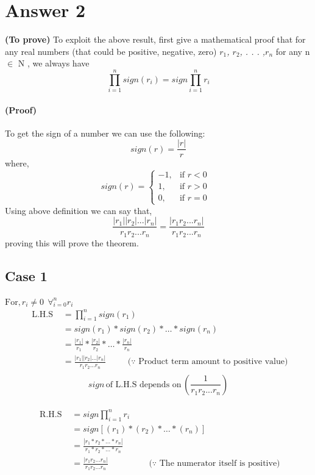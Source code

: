 \documentclass{article}
\begin{document}
\section{Answer 2}
\label{gen_inst}
\textbf{(To prove)}  To exploit the above result, first give a mathematical proof that for any real numbers
(that could be positive, negative, zero) \emph{$r_1$, $r_2$, . . . ,$ r_n$} for any n $\in$ N , we always have
\[\prod_{i=1 }^n sign(r_i) = sign \prod_{i=1}^n r_i\]

\paragraph{(Proof)}
To get the sign of a number we can use the following:
\begin{equation} \label{eq2}
sign(r)= \frac{|r|}{r}
\end{equation}
where,
$$
sign(r)=\begin{cases}
			-1, & \text{if $r<0$ }\\
            1, & \text{if $r>0$}\\
	0, & \text{if $r=0$}
		 \end{cases}
$$
Using above definition we can say that,
\[ \frac{|r_1||r_2|...|r_n|}{r_1r_2...r_n} = \frac {|r_1r_2...r_n|}{r_1r_2...r_n}\]
proving this will prove the theorem.\\

\subsection{Case 1}

$ \text{For,} \, r_i \ne 0  \;\, \forall_{i=0}^n r_i $
\begin{equation} \label{eq3}
\begin{split}
\text{ L.H.S } & =  \prod_{i=1 }^n sign(r_1)  \\
& = sign(r_1)*sign(r_2)*\dots *sign(r_n)  \\
& = \frac{|r_1|}{r_1}*\frac{|r_2|}{r_2}*\dots * \frac{|r_n|}{r_n}\\
& = \frac{|r_1||r_2|...|r_n|}{r_1r_2...r_n}\, \hspace{1cm} \text{($\because$ Product term amount to positive value)}\\
\end{split}
\end{equation}
\[sign \, \text{of L.H.S depends on}\, (\frac{1}{r_1r_2...r_n})\]
\\
\begin{equation} \label{eq4}
\begin{split}
\text{ R.H.S } & =  sign \prod_{i=1}^n r_i \\
& = sign[(r_1)*(r_2)*\dots *(r_n)]  \\
& = \frac{|r_1*r_2* \dots *r_n|}{r_1*r_2* \dots *r_n} \hspace{5cm}\\
& = \frac{|r_1r_2\dots r_n|}{r_1r_2...r_n} \hspace{2cm} \text{($\because$ The numerator itself is positive)} \\
\end{split}
\end{equation}
\end{document}
